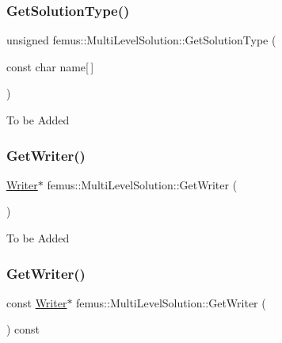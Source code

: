 \subsubsection{\texorpdfstring{Get\+Solution\+Type()}{GetSolutionType()}\hspace{0.1cm}{\footnotesize\ttfamily [2/2]}}
{\footnotesize\ttfamily unsigned femus\+::\+Multi\+Level\+Solution\+::\+Get\+Solution\+Type (\begin{DoxyParamCaption}\item[{const char}]{name\mbox{[}$\,$\mbox{]} }\end{DoxyParamCaption})}

To be Added \mbox{\label{classfemus_1_1_multi_level_solution_a231740aeb542389671b771902bfeeb34}} 
\subsubsection{\texorpdfstring{Get\+Writer()}{GetWriter()}\hspace{0.1cm}{\footnotesize\ttfamily [1/2]}}
{\footnotesize\ttfamily \mbox{\hyperlink{classfemus_1_1_writer}{Writer}}$\ast$ femus\+::\+Multi\+Level\+Solution\+::\+Get\+Writer (\begin{DoxyParamCaption}{ }\end{DoxyParamCaption})\hspace{0.3cm}{\ttfamily [inline]}}

To be Added \mbox{\label{classfemus_1_1_multi_level_solution_a775f0e2e4d2b3d55fcaa7f1936f91cf3}} 
\subsubsection{\texorpdfstring{Get\+Writer()}{GetWriter()}\hspace{0.1cm}{\footnotesize\ttfamily [2/2]}}
{\footnotesize\ttfamily const \mbox{\hyperlink{classfemus_1_1_writer}{Writer}}$\ast$ femus\+::\+Multi\+Level\+Solution\+::\+Get\+Writer (\begin{DoxyParamCaption}{ }\end{DoxyParamCaption}) const\hspace{0.3cm}{\ttfamily [inline]}}

